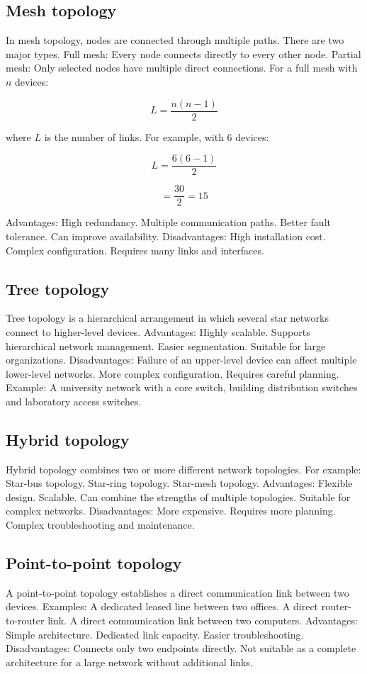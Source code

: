 \subsection{Mesh topology}


In mesh topology, nodes are connected through multiple paths.
There are two major types.
Full mesh: Every node connects directly to every other node.
Partial mesh: Only selected nodes have multiple direct connections.
For a full mesh with $n$ devices:

\[
\boxed{L=\frac{n(n-1)}{2}}
\]

where $L$ is the number of links.
For example, with 6 devices:

\[
L=\frac{6(6-1)}{2}
\]


\[
=\frac{30}{2}=\boxed{15}
\]

Advantages:
High redundancy.
Multiple communication paths.
Better fault tolerance.
Can improve availability.
Disadvantages:
High installation cost.
Complex configuration.
Requires many links and interfaces.
\subsection{Tree topology}


Tree topology is a hierarchical arrangement in which several star networks connect to higher-level devices.
Advantages:
Highly scalable.
Supports hierarchical network management.
Easier segmentation.
Suitable for large organizations.
Disadvantages:
Failure of an upper-level device can affect multiple lower-level networks.
More complex configuration.
Requires careful planning.
Example: A university network with a core switch, building distribution switches and laboratory access switches.
\subsection{Hybrid topology}


Hybrid topology combines two or more different network topologies.
For example:
Star-bus topology.
Star-ring topology.
Star-mesh topology.
Advantages:
Flexible design.
Scalable.
Can combine the strengths of multiple topologies.
Suitable for complex networks.
Disadvantages:
More expensive.
Requires more planning.
Complex troubleshooting and maintenance.
\subsection{Point-to-point topology}


A point-to-point topology establishes a direct communication link between two devices.
Examples:
A dedicated leased line between two offices.
A direct router-to-router link.
A direct communication link between two computers.
Advantages:
Simple architecture.
Dedicated link capacity.
Easier troubleshooting.
Disadvantages:
Connects only two endpoints directly.
Not suitable as a complete architecture for a large network without additional links.
